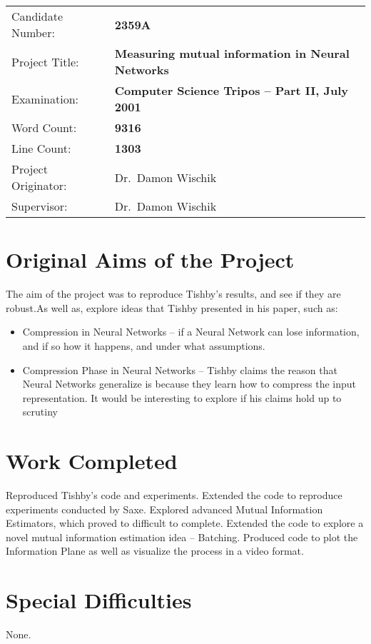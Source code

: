 \documentclass[dissertation.tex]{subfiles}
\begin{document}
{\large
\begin{tabular}{ll}
Candidate Number:   & \bf 2359A                      \\
Project Title:      & \bf Measuring mutual information in Neural Networks \\
Examination:        & \bf Computer Science Tripos -- Part II, July 2001  \\
Word Count:         & \bf 9316\footnotemark[1] \\
Line Count:         & \bf 1303\footnotemark[2] \\
Project Originator: & Dr.\ Damon Wischik                  \\
Supervisor:         & Dr.\ Damon Wischik                  \\ 
\end{tabular}
}


\section*{Original Aims of the Project}

The aim of the project was to reproduce Tishby's results, and see if they are
robust.As well as, explore ideas that Tishby presented in his paper, such as: 
\begin{itemize}
  \item{
      Compression in Neural Networks -- if a Neural Network can lose
      information, and if so how it happens, and under what assumptions.
    }
  \item{
      Compression Phase in Neural Networks -- Tishby claims the reason that
      Neural Networks generalize is because they learn how to compress the input
      representation. It would be interesting to explore if his claims hold up
      to scrutiny
    }
\end{itemize}

\section*{Work Completed}

Reproduced Tishby's code and experiments. Extended the code to reproduce
experiments conducted by Saxe. Explored advanced Mutual Information Estimators,
which proved to difficult to complete. Extended the code to explore a novel
mutual information estimation idea -- Batching. Produced code to plot the
Information Plane as well as visualize the process in a video format.

\section*{Special Difficulties}

None.

\newpage
\end{document}
